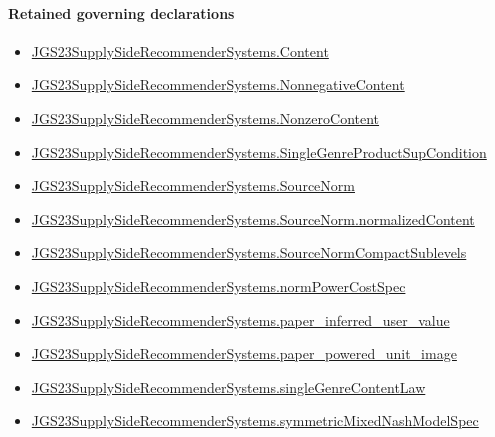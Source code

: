 \documentclass[10pt]{article}
\begin{document}
\paragraph{Retained governing declarations}
\begin{itemize}\raggedright
\item \hyperlink{governing-declaration-367305fda50f0ada}{JGS23\allowbreak{}Supply\allowbreak{}Side\allowbreak{}Recommender\allowbreak{}Systems.\allowbreak{}Content}
\item \hyperlink{governing-declaration-d426babe40b9593c}{JGS23\allowbreak{}Supply\allowbreak{}Side\allowbreak{}Recommender\allowbreak{}Systems.\allowbreak{}Nonnegative\allowbreak{}Content}
\item \hyperlink{governing-declaration-90e2ac7d13788c50}{JGS23\allowbreak{}Supply\allowbreak{}Side\allowbreak{}Recommender\allowbreak{}Systems.\allowbreak{}Nonzero\allowbreak{}Content}
\item \hyperlink{governing-declaration-c26bf983a5931de7}{JGS23\allowbreak{}Supply\allowbreak{}Side\allowbreak{}Recommender\allowbreak{}Systems.\allowbreak{}Single\allowbreak{}Genre\allowbreak{}Product\allowbreak{}Sup\allowbreak{}Condition}
\item \hyperlink{governing-declaration-6141339a5d3412d9}{JGS23\allowbreak{}Supply\allowbreak{}Side\allowbreak{}Recommender\allowbreak{}Systems.\allowbreak{}Source\allowbreak{}Norm}
\item \hyperlink{governing-declaration-dd171705f4075880}{JGS23\allowbreak{}Supply\allowbreak{}Side\allowbreak{}Recommender\allowbreak{}Systems.\allowbreak{}Source\allowbreak{}Norm.\allowbreak{}normalized\allowbreak{}Content}
\item \hyperlink{governing-declaration-0d92048317064110}{JGS23\allowbreak{}Supply\allowbreak{}Side\allowbreak{}Recommender\allowbreak{}Systems.\allowbreak{}Source\allowbreak{}Norm\allowbreak{}Compact\allowbreak{}Sublevels}
\item \hyperlink{governing-declaration-6ba13dc1cae95e6e}{JGS23\allowbreak{}Supply\allowbreak{}Side\allowbreak{}Recommender\allowbreak{}Systems.\allowbreak{}norm\allowbreak{}Power\allowbreak{}Cost\allowbreak{}Spec}
\item \hyperlink{governing-declaration-48347eafb3702717}{JGS23\allowbreak{}Supply\allowbreak{}Side\allowbreak{}Recommender\allowbreak{}Systems.\allowbreak{}paper\_\allowbreak{}inferred\_\allowbreak{}user\_\allowbreak{}value}
\item \hyperlink{governing-declaration-41ef1ed062d142a1}{JGS23\allowbreak{}Supply\allowbreak{}Side\allowbreak{}Recommender\allowbreak{}Systems.\allowbreak{}paper\_\allowbreak{}powered\_\allowbreak{}unit\_\allowbreak{}image}
\item \hyperlink{governing-declaration-205216ea3d333b14}{JGS23\allowbreak{}Supply\allowbreak{}Side\allowbreak{}Recommender\allowbreak{}Systems.\allowbreak{}single\allowbreak{}Genre\allowbreak{}Content\allowbreak{}Law}
\item \hyperlink{paper-prerequisite-b412efba7deb757f}{JGS23\allowbreak{}Supply\allowbreak{}Side\allowbreak{}Recommender\allowbreak{}Systems.\allowbreak{}symmetric\allowbreak{}Mixed\allowbreak{}Nash\allowbreak{}Model\allowbreak{}Spec}
\end{itemize}
\end{document}
